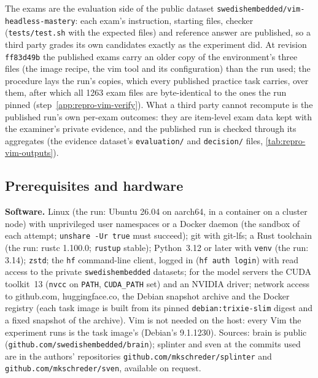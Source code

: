 \begin{sloppypar}
The exams are the evaluation side of the public dataset \nolinkurl{swedishembedded/vim-headless-mastery}: each exam's
instruction, starting files, checker (\texttt{tests/test.sh} with the expected files) and reference answer are published, so a
third party grades its own candidates exactly as the experiment did. At revision \texttt{ff83d49b} the published exams carry an
older copy of the environment's three files (the image recipe, the vim tool and its configuration) than the run used; the
procedure lays the run's copies, which every published practice task carries, over them, after which all 1263 exam files are
byte-identical to the ones the run pinned (step~\ref{app:repro-vim-verify}). What a third party cannot recompute is the
published run's own per-exam outcomes: they are item-level exam data kept with the examiner's private evidence, and the
published run is checked through its aggregates (the evidence dataset's \texttt{evaluation/} and \texttt{decision/} files,
\cref{tab:repro-vim-outputs}).
\end{sloppypar}

\subsection{Prerequisites and hardware}\label{app:repro-vim-prereq}

\begin{sloppypar}
\textbf{Software.} Linux (the run: Ubuntu 26.04 on aarch64, in a container on a cluster node) with unprivileged user
namespaces or a Docker daemon (the sandbox of each attempt; \texttt{unshare -Ur true} must succeed); git with git-lfs; a Rust
toolchain (the run: rustc 1.100.0; \texttt{rustup} stable); Python~3.12 or later with \texttt{venv} (the run: 3.14);
\texttt{zstd}; the \texttt{hf} command-line client, logged in (\texttt{hf auth login}) with read access to the private
\texttt{swedishembedded} datasets; for the model servers the CUDA toolkit~13 (\texttt{nvcc} on \texttt{PATH},
\texttt{CUDA\_PATH} set) and an NVIDIA driver; network access to github.com, huggingface.co, the Debian snapshot archive and
the Docker registry (each task image is built from its pinned \texttt{debian:trixie-slim} digest and a fixed snapshot of
the archive). Vim is not needed on the host: every Vim the experiment runs is the task image's (Debian's 9.1.1230). Sources:
brain is public (\nolinkurl{github.com/swedishembedded/brain}); splinter and sven at the commits used are in the authors'
repositories \nolinkurl{github.com/mkschreder/splinter} and \nolinkurl{github.com/mkschreder/sven}, available on request.
\end{sloppypar}


